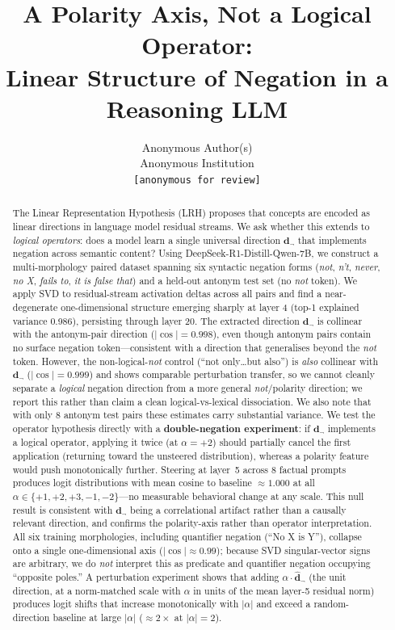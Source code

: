 \documentclass{article}
\title{A Polarity Axis, Not a Logical Operator:\\
Linear Structure of Negation in a Reasoning LLM}
\author{Anonymous Author(s) \\ Anonymous Institution \\ \texttt{[anonymous for review]}}
\begin{document}
\maketitle

\begin{abstract}
The Linear Representation Hypothesis (LRH) proposes that concepts are encoded as linear directions in language model residual streams.
We ask whether this extends to \emph{logical operators}: does a model learn a single universal direction $\mathbf{d}_{\neg}$ that implements negation across semantic content?
Using DeepSeek-R1-Distill-Qwen-7B, we construct a multi-morphology paired dataset spanning six syntactic negation forms (\textit{not}, \textit{n't}, \textit{never}, \textit{no X}, \textit{fails to}, \textit{it is false that}) and a held-out antonym test set (no \textit{not} token).
We apply SVD to residual-stream activation deltas across all pairs and find a near-degenerate one-dimensional structure emerging sharply at layer 4 (top-1 explained variance 0.986), persisting through layer 20.
The extracted direction $\mathbf{d}_{\neg}$ is collinear with the antonym-pair direction ($|\cos| = 0.998$), even though antonym pairs contain no surface negation token---consistent with a direction that generalises beyond the \textit{not} token.
However, the non-logical-\textit{not} control (``not only\ldots but also'') is \emph{also} collinear with $\mathbf{d}_{\neg}$ ($|\cos| = 0.999$) and shows comparable perturbation transfer, so we cannot cleanly separate a \emph{logical} negation direction from a more general \textit{not}/polarity direction; we report this rather than claim a clean logical-vs-lexical dissociation.
We also note that with only 8 antonym test pairs these estimates carry substantial variance.
We test the operator hypothesis directly with a \textbf{double-negation experiment}: if $\mathbf{d}_{\neg}$ implements a logical operator, applying it twice (at $\alpha = +2$) should partially cancel the first application (returning toward the unsteered distribution), whereas a polarity feature would push monotonically further.
Steering at layer~5 across 8 factual prompts produces logit distributions with mean cosine to baseline $\approx 1.000$ at all $\alpha \in \{+1, +2, +3, -1, -2\}$---no measurable behavioral change at any scale.
This null result is consistent with $\mathbf{d}_{\neg}$ being a correlational artifact rather than a causally relevant direction, and confirms the polarity-axis rather than operator interpretation.
All six training morphologies, including quantifier negation (``No X is Y''), collapse onto a single one-dimensional axis ($|\cos|\approx 0.99$); because SVD singular-vector signs are arbitrary, we do \emph{not} interpret this as predicate and quantifier negation occupying ``opposite poles.''
A perturbation experiment shows that adding $\alpha \cdot \hat{\mathbf{d}}_{\neg}$ (the unit direction, at a norm-matched scale with $\alpha$ in units of the mean layer-5 residual norm) produces logit shifts that increase monotonically with $|\alpha|$ and exceed a random-direction baseline at large $|\alpha|$ ($\approx 2\times$ at $|\alpha|=2$).
\end{abstract}
\end{document}
